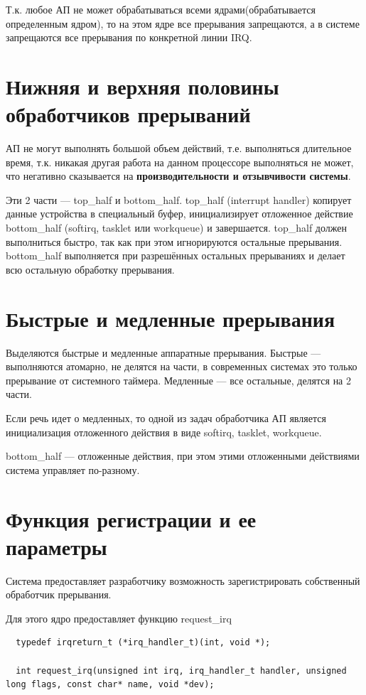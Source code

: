 Т.к. любое АП не может обрабатываться всеми ядрами(обрабатывается определенным ядром), то на этом ядре все прерывания запрещаются, а в системе запрещаются все прерывания по конкретной линии IRQ.

\section{Нижняя и верхняя половины обработчиков прерываний}

АП не могут выполнять большой объем действий, т.е. выполняться длительное время, т.к. никакая другая работа на данном процессоре выполняться не может, что негативно сказывается на \textbf{производительности и отзывчивости системы}.

Эти 2 части --- top\_half и bottom\_half. top\_half (interrupt handler) копирует данные устройства в специальный буфер, инициализирует отложенное действие \\ bottom\_half (softirq, tasklet или workqueue) и завершается. top\_half должен выполниться быстро, так как при этом игнорируются остальные прерывания. bottom\_half выполняется при разрешённых остальных прерываниях и делает всю остальную обработку прерывания.

\section{Быстрые и медленные прерывания}

Выделяются быстрые и медленные аппаратные прерывания. Быстрые --- выполняются атомарно, не делятся на части, в современных системах это только прерывание от системного таймера. Медленные --- все остальные, делятся на 2 части.

Если речь идет о медленных, то одной из задач обработчика АП является инициализация отложенного действия в виде softirq, tasklet, workqueue.

bottom\_half --- отложенные действия, при этом этими отложенными действиями система управляет по-разному.

\section{Функция регистрации и ее параметры}

Система предоставляет разработчику возможность зарегистрировать собственный обработчик прерывания.

Для этого ядро предоставляет функцию request\_irq

\begin{lstlisting}
  typedef irqreturn_t (*irq_handler_t)(int, void *); 
  
  int request_irq(unsigned int irq, irq_handler_t handler, unsigned long flags, const char* name, void *dev);
\end{lstlisting}

